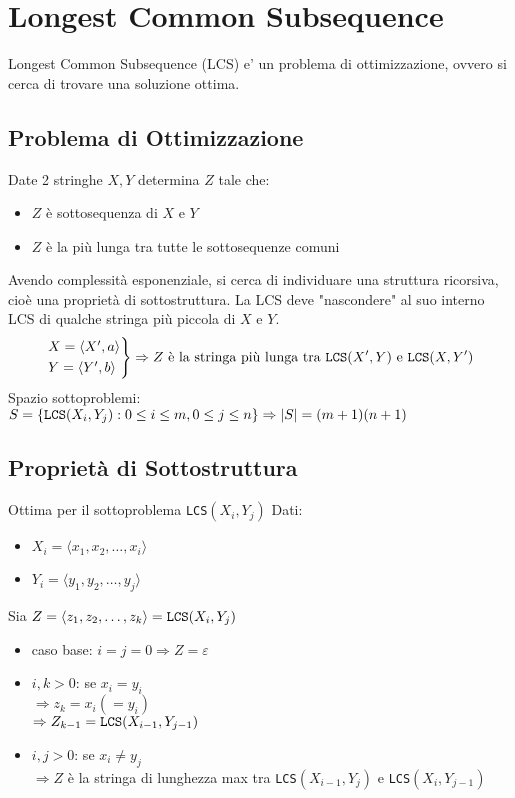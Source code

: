 \section{Longest Common Subsequence}
Longest Common Subsequence (LCS) e' un problema di ottimizzazione, ovvero si cerca di trovare una soluzione ottima.
\subsection{Problema di Ottimizzazione}
\begin{mdframed}
    Date 2 stringhe $X,Y$ determina $Z$ tale che:
    \begin{itemize}
        \item $Z$ è sottosequenza di $X$ e $Y$
        \item $Z$ è la più lunga tra tutte le sottosequenze comuni
    \end{itemize}
\end{mdframed}
Avendo complessità esponenziale, si cerca di individuare una struttura ricorsiva, cioè una proprietà di sottostruttura. La LCS deve "nascondere" al suo interno LCS di qualche stringa più piccola di $X$ e $Y$.
\begin{equation*}
\begin{rcases}
    X = \langle X',a \rangle \\
    Y = \langle Y',b \rangle
\end{rcases} \Rightarrow Z \text{ è la stringa più lunga tra } \verb|LCS|(X',Y) \text{ e } \verb|LCS|(X,Y')
\end{equation*}
Spazio sottoproblemi: $S = \{ \verb|LCS|(X_i,Y_j): 0 \leq i \leq m, 0 \leq j \leq n \} \Rightarrow |S| = (m+1)(n+1)$

\subsection{Proprietà di Sottostruttura}
Ottima per il sottoproblema \verb|LCS|$(X_i,Y_j)$
Dati:
\begin{itemize}
    \item $X_i = \langle x_1,x_2,\dots,x_i \rangle$
    \item $Y_i = \langle y_1,y_2,\dots,y_j \rangle$
\end{itemize}
Sia $Z = \langle z_1,z_2,\dots,z_k \rangle = \verb|LCS|(X_i,Y_j)$
\begin{itemize}
    \item caso base: $i = j = 0 \Rightarrow Z = \varepsilon$
    \item $i,k>0$: se $x_i = y_i$ \\
    $\Rightarrow z_k = x_i(= y_i)$ \\
    $\Rightarrow Z_{k-1} = \verb|LCS|(X_{i-1},Y_{j-1})$
    \item $i,j>0$: se $x_i \not= y_j$ \\
    $\Rightarrow Z$ è la stringa di lunghezza max tra \verb|LCS|$(X_{i-1},Y_j)$ e \verb|LCS|$(X_i,Y_{j-1})$
\end{itemize}

